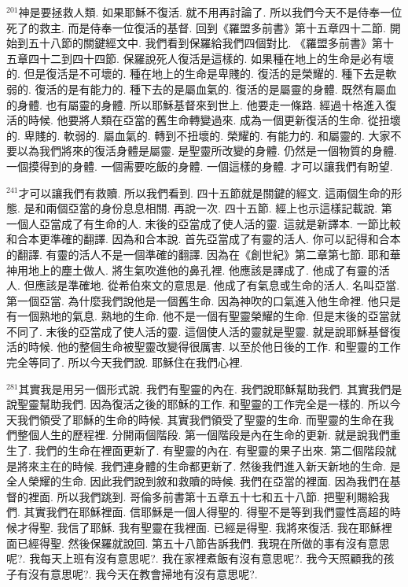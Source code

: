 \documentclass{book}
\begin{document}
$^{201}$神是要拯救人類.
如果耶穌不復活.
就不用再討論了.
所以我們今天不是侍奉一位死了的救主.
而是侍奉一位復活的基督.
回到《羅盟多前書》第十五章四十二節.
開始到五十八節的關鍵經文中.
我們看到保羅給我們四個對比.
《羅盟多前書》第十五章四十二到四十四節.
保羅說死人復活是這樣的.
如果種在地上的生命是必有壞的.
但是復活是不可壞的.
種在地上的生命是卑賤的.
復活的是榮耀的.
種下去是軟弱的.
復活的是有能力的.
種下去的是屬血氣的.
復活的是屬靈的身體.
既然有屬血的身體.
也有屬靈的身體.
所以耶穌基督來到世上.
他要走一條路.
經過十格進入復活的時候.
他要將人類在亞當的舊生命轉變過來.
成為一個更新復活的生命.
從扭壞的.
卑賤的.
軟弱的.
屬血氣的.
轉到不扭壞的.
榮耀的.
有能力的.
和屬靈的.
大家不要以為我們將來的復活身體是屬靈.
是聖靈所改變的身體.
仍然是一個物質的身體.
一個摸得到的身體.
一個需要吃飯的身體.
一個這樣的身體.
才可以讓我們有盼望.

$^{241}$才可以讓我們有救贖.
所以我們看到.
四十五節就是關鍵的經文.
這兩個生命的形態.
是和兩個亞當的身份息息相關.
再說一次.
四十五節.
經上也示這樣記載說.
第一個人亞當成了有生命的人.
末後的亞當成了使人活的靈.
這就是新譯本.
一節比較和合本更準確的翻譯.
因為和合本說.
首先亞當成了有靈的活人.
你可以記得和合本的翻譯.
有靈的活人不是一個準確的翻譯.
因為在《創世紀》第二章第七節.
耶和華神用地上的塵土做人.
將生氣吹進他的鼻孔裡.
他應該是譯成了.
他成了有靈的活人.
但應該是準確地.
從希伯來文的意思是.
他成了有氣息或生命的活人.
名叫亞當.
第一個亞當.
為什麼我們說他是一個舊生命.
因為神吹的口氣進入他生命裡.
他只是有一個熟地的氣息.
熟地的生命.
他不是一個有聖靈榮耀的生命.
但是末後的亞當就不同了.
末後的亞當成了使人活的靈.
這個使人活的靈就是聖靈.
就是說耶穌基督復活的時候.
他的整個生命被聖靈改變得很厲害.
以至於他日後的工作.
和聖靈的工作完全等同了.
所以今天我們說.
耶穌住在我們心裡.

$^{281}$其實我是用另一個形式說.
我們有聖靈的內在.
我們說耶穌幫助我們.
其實我們是說聖靈幫助我們.
因為復活之後的耶穌的工作.
和聖靈的工作完全是一樣的.
所以今天我們領受了耶穌的生命的時候.
其實我們領受了聖靈的生命.
而聖靈的生命在我們整個人生的歷程裡.
分開兩個階段.
第一個階段是內在生命的更新.
就是說我們重生了.
我們的生命在裡面更新了.
有聖靈的內在.
有聖靈的果子出來.
第二個階段就是將來主在的時候.
我們連身體的生命都更新了.
然後我們進入新天新地的生命.
是全人榮耀的生命.
因此我們說到敘和救贖的時候.
我們在亞當的裡面.
因為我們在基督的裡面.
所以我們跳到.
哥倫多前書第十五章五十七和五十八節.
把聖利賜給我們.
其實我們在耶穌裡面.
信耶穌是一個人得聖的.
得聖不是等到我們靈性高超的時候才得聖.
我信了耶穌.
我有聖靈在我裡面.
已經是得聖.
我將來復活.
我在耶穌裡面已經得聖.
然後保羅就說回.
第五十八節告訴我們.
我現在所做的事有沒有意思呢?.
我每天上班有沒有意思呢?.
我在家裡煮飯有沒有意思呢?.
我今天照顧我的孩子有沒有意思呢?.
我今天在教會掃地有沒有意思呢?.
\end{document}
